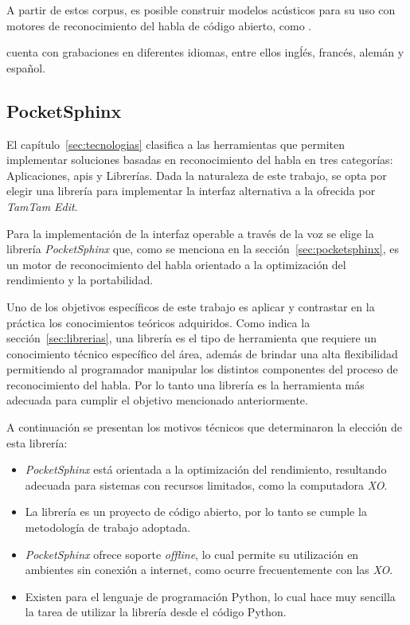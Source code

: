 A partir de estos corpus, es posible construir modelos ac\'usticos para su uso con motores de reconocimiento
del habla de c\'odigo abierto, como .

 cuenta con grabaciones en diferentes idiomas, entre ellos ingĺ\'es, franc\'es, 
alem\'an y espa\~nol.


\subsection{PocketSphinx}

El cap\'itulo~\ref{sec:tecnologias} clasifica a las herramientas que permiten implementar soluciones
basadas en reconocimiento del habla en tres categor\'ias: Aplicaciones, \gls{api}s y Librer\'ias. Dada la naturaleza
de este trabajo, se opta por elegir una librer\'ia para implementar la interfaz alternativa a la ofrecida por
\emph{TamTam Edit}.

Para la implementaci\'on de la interfaz operable a trav\'es de la voz se elige la librer\'ia \emph{PocketSphinx}
que, como se menciona en la secci\'on~\ref{sec:pocketsphinx}, es un motor de reconocimiento del habla 
orientado a la optimizaci\'on del rendimiento y la portabilidad.

Uno de los objetivos espec\'ificos de este trabajo es aplicar y contrastar en la pr\'actica
los conocimientos te\'oricos adquiridos. Como indica la secci\'on~\ref{sec:librerias}, una librer\'ia es
el tipo de herramienta que requiere un conocimiento t\'ecnico espec\'ifico del \'area, adem\'as de
brindar una alta flexibilidad permitiendo al programador manipular los distintos componentes del
proceso de reconocimiento del habla. Por lo tanto una librer\'ia es la herramienta m\'as adecuada
para cumplir el objetivo mencionado anteriormente.

A continuaci\'on se presentan los motivos t\'ecnicos que determinaron la elecci\'on de esta librer\'ia:

\begin{itemize}
    \item \emph{PocketSphinx} est\'a orientada a la optimizaci\'on del rendimiento, resultando adecuada 
    para sistemas con recursos limitados, como la computadora \emph{XO}.
    \item La librer\'ia es un proyecto de c\'odigo abierto, por lo tanto se cumple la metodolog\'ia 
    de trabajo adoptada.
    \item \emph{PocketSphinx} ofrece soporte \emph{offline}, lo cual permite su utilizaci\'on en ambientes
    sin conexi\'on a internet, como ocurre frecuentemente con las \emph{XO}.
    \item Existen  para el lenguaje de programaci\'on Python, lo cual hace muy sencilla la 
    tarea de utilizar la librer\'ia desde el c\'odigo Python.
\end{itemize}

